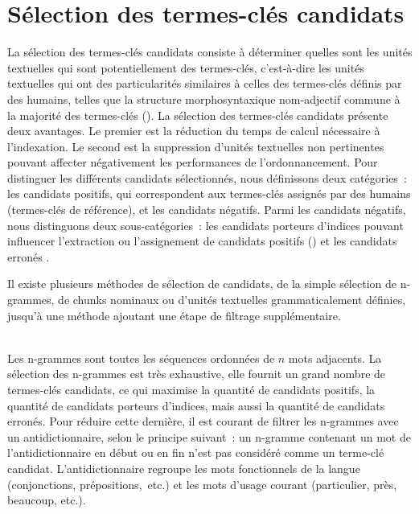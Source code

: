   \section{Sélection des termes-clés candidats}
  \label{sec:main-state_of_the_art-keyphrase_candidate_selection}
    La sélection des termes-clés candidats consiste à déterminer quelles sont
    les unités textuelles qui sont potentiellement des termes-clés, c'est-à-dire
    les unités textuelles qui ont des particularités similaires à celles des
    termes-clés définis par des humains, telles que la structure
    morphosyntaxique nom-adjectif commune à la majorité des termes-clés
    (). La sélection des termes-clés candidats présente deux
    avantages. Le premier est la réduction du temps de calcul nécessaire à
    l'indexation. Le second est la suppression d'unités textuelles non
    pertinentes pouvant affecter négativement les performances de
    l'ordonnancement. Pour distinguer les différents candidats sélectionnés,
    nous définissons deux catégories~: les candidats positifs, qui
    correspondent aux termes-clés assignés par des humains (termes-clés de
    référence), et les candidats négatifs. Parmi les candidats négatifs,
    nous distinguons deux sous-catégories~: les candidats porteurs
    d'indices pouvant influencer l'extraction ou
    l'assignement de candidats positifs () et les candidats
    erronés .

    Il existe plusieurs méthodes de sélection de candidats, de la simple
    sélection de n-grammes, de chunks nominaux ou d'unités textuelles
    grammaticalement définies, jusqu'à une méthode ajoutant une étape de
    filtrage supplémentaire.

    ~\\Les n-grammes sont
    toutes les séquences ordonnées de $n$ mots adjacents. La sélection des
    n-grammes est très exhaustive, elle fournit un grand nombre de termes-clés
    candidats, ce qui maximise la quantité de candidats positifs, la quantité de
    candidats porteurs d'indices, mais aussi la quantité de candidats erronés.
    Pour réduire cette dernière, il est courant de filtrer les n-grammes avec un
    antidictionnaire, selon le principe suivant~: un n-gramme
    contenant un mot de l'antidictionnaire en début ou en fin n'est pas
    considéré comme un terme-clé candidat. L'antidictionnaire regroupe les mots
    fonctionnels de la langue (conjonctions, prépositions,~etc.) et les mots
    d'usage courant (\og{}particulier\fg{}, \og{}près\fg{}, \og{}beaucoup\fg{},
    etc.).
    
